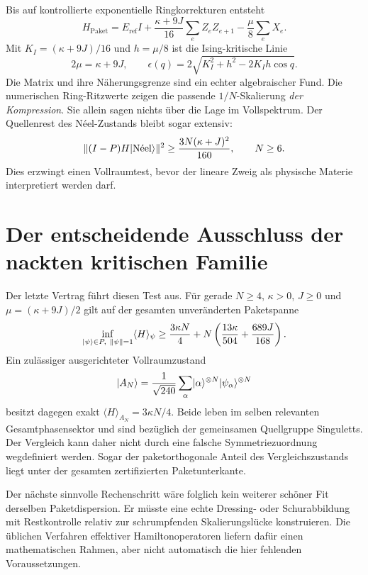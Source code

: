 Bis auf kontrollierte exponentielle Ringkorrekturen entsteht
\[
 H_{\mathrm{Paket}}=E_{\mathrm{ref}}I
 +\frac{\kappa+9J}{16}\sum_e Z_eZ_{e+1}
 -\frac\mu8\sum_e X_e.
\]
Mit $K_I=(\kappa+9J)/16$ und $h=\mu/8$ ist die Ising-kritische Linie
\[
 2\mu=\kappa+9J,\qquad
 \epsilon(q)=2\sqrt{K_I^2+h^2-2K_Ih\cos q}.
\]
Die Matrix und ihre Näherungsgrenze sind ein echter algebraischer Fund. Die numerischen Ring-Ritzwerte zeigen die passende $1/N$-Skalierung \emph{der Kompression}. Sie allein sagen nichts über die Lage im Vollspektrum. Der Quellenrest des Néel-Zustands bleibt sogar extensiv:
\[
 \|(I-P)H\lvert \mathrm{N\acute eel}\rangle\|^2
 \ge\frac{3N(\kappa+J)^2}{160},\qquad N\ge6.
\]
Dies erzwingt einen Vollraumtest, bevor der lineare Zweig als physische Materie interpretiert werden darf. 

\section{Der entscheidende Ausschluss der nackten kritischen Familie}
Der letzte Vertrag führt diesen Test aus. Für gerade $N\ge4$, $\kappa>0$, $J\ge0$ und $\mu=(\kappa+9J)/2$ gilt auf der gesamten unveränderten Paketspanne
\[
 \inf_{\lvert \psi\rangle\in P,\ \|\psi\|=1}\langle H\rangle_\psi
 \ge\frac{3\kappa N}{4}
 +N\left(\frac{13\kappa}{504}+\frac{689J}{168}\right).
\]
Ein zulässiger ausgerichteter Vollraumzustand
\[
 \lvert A_N\rangle=\frac1{\sqrt{240}}\sum_\alpha
 \lvert \alpha\rangle^{\otimes N}\lvert \psi_\alpha\rangle^{\otimes N}
\]
besitzt dagegen exakt $\langle H\rangle_{A_N}=3\kappa N/4$. Beide leben im selben relevanten Gesamtphasensektor und sind bezüglich der gemeinsamen Quellgruppe Singuletts. Der Vergleich kann daher nicht durch eine falsche Symmetriezuordnung wegdefiniert werden. Sogar der paketorthogonale Anteil des Vergleichszustands liegt unter der gesamten zertifizierten Paketunterkante. 


Der nächste sinnvolle Rechenschritt wäre folglich kein weiterer schöner Fit derselben Paketdispersion. Er müsste eine echte Dressing- oder Schurabbildung mit Restkontrolle relativ zur schrumpfenden Skalierungslücke konstruieren. Die üblichen Verfahren effektiver Hamiltonoperatoren liefern dafür einen mathematischen Rahmen, aber nicht automatisch die hier fehlenden Voraussetzungen. \cite{sw}

